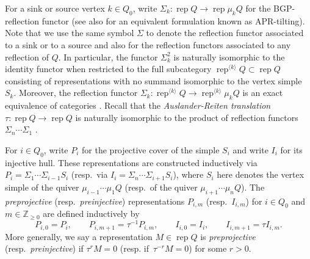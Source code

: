 \documentclass{amsart}
\newtheorem{lemma}[theorem]{Lemma}
\numberwithin{equation}{section}
\newcommand{\ZZ}{\mathbb{Z}}
\newcommand{\Hom}{\operatorname{Hom}}
\newcommand{\Irr}{\operatorname{Irr}}
\newcommand{\rep}{\operatorname{rep}}
\begin{document}
For a sink or source vertex $k\in Q_0$, write $\Sigma_k:\rep Q\to\rep \mu_k Q$ for the BGP-reflection functor \cite{BGP??} (see also \cite{APR??} for an equivalent formulation known as APR-tilting).
Note that we use the same symbol $\Sigma$ to denote the reflection functor associated to a sink or to a source and also for the reflection functors associated to any reflection of $Q$.
In particular, the functor $\Sigma_k^2$ is naturally isomorphic to the identity functor when restricted to the full subcategory $\rep^{\langle k\rangle} Q\subset\rep Q$ consisting of representations with no summand isomorphic to the vertex simple $S_k$.
Moreover, the reflection functor $\Sigma_k:\rep^{\langle k\rangle} Q\to\rep^{\langle k\rangle} \mu_k Q$ is an exact equivalence of categories \cite{DR76}.
Recall that the \emph{Auslander-Reiten translation} $\tau:\rep Q\to\rep Q$ is naturally isomorphic to the product of reflection functors $\Sigma_n\cdots\Sigma_1$ \cite{BB??}.

For $i\in Q_0$, write $P_i$ for the projective cover of the simple $S_i$ and write $I_i$ for its injective hull.
These representations are constructed inductively via $P_i=\Sigma_1\cdots\Sigma_{i-1}S_i$ (resp.~via $I_i=\Sigma_n\cdots\Sigma_{i+1}S_i$), where $S_i$ here denotes the vertex simple of the quiver $\mu_{i-1}\cdots\mu_1 Q$ (resp.~of the quiver $\mu_{i+1}\cdots\mu_n Q$).
The \emph{preprojective} (resp.~\emph{preinjective}) representations $P_{i,m}$ (resp.~$I_{i,m}$) for $i\in Q_0$ and $m\in\ZZ_{\ge0}$ are defined inductively by
\[P_{i,0}=P_i,\qquad P_{i,m+1}=\tau^{-1} P_{i,m},\qquad I_{i,0}=I_i,\qquad I_{i,m+1}=\tau I_{i,m}.\]
More generally, we say a representation $M\in\rep Q$ is \emph{preprojective} (resp.~\emph{preinjective}) if $\tau^r M=0$ (resp. if~$\tau^{-r} M=0$) for some $r>0$.
\end{document}
